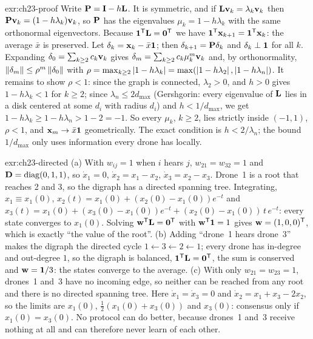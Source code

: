 \begin{solution}{exr:ch23-proof}
Write $\mathbf{P}=\mathbf{I}-h\mathbf{L}$. It is symmetric, and if $\mathbf{L}\mathbf{v}_k=\lambda_k\mathbf{v}_k$ then $\mathbf{P}\mathbf{v}_k=(1-h\lambda_k)\mathbf{v}_k$, so $\mathbf{P}$ has the eigenvalues $\mu_k=1-h\lambda_k$ with the same orthonormal eigenvectors. Because $\mathbf{1}^{\mathsf{T}}\mathbf{L}=\mathbf{0}^{\mathsf{T}}$ we have $\mathbf{1}^{\mathsf{T}}\mathbf{x}_{k+1}=\mathbf{1}^{\mathsf{T}}\mathbf{x}_k$: the average $\bar x$ is preserved. Let $\mathbf{\delta}_k=\mathbf{x}_k-\bar x\mathbf{1}$; then $\mathbf{\delta}_{k+1}=\mathbf{P}\mathbf{\delta}_k$ and $\mathbf{\delta}_k\perp\mathbf{1}$ for all $k$. Expanding $\mathbf{\delta}_0=\sum_{k\ge2}c_k\mathbf{v}_k$ gives $\mathbf{\delta}_m=\sum_{k\ge2}c_k\mu_k^m\mathbf{v}_k$ and, by orthonormality, $\left\lVert \mathbf{\delta}_m \right\rVert\le\rho^m\left\lVert \mathbf{\delta}_0 \right\rVert$ with $\rho=\max_{k\ge2}\left\lvert 1-h\lambda_k \right\rvert=\max(\left\lvert 1-h\lambda_2 \right\rvert,\left\lvert 1-h\lambda_n \right\rvert)$. It remains to show $\rho<1$: since the graph is connected, $\lambda_2>0$, and $h>0$ gives $1-h\lambda_k<1$ for $k\ge2$; since $\lambda_n\le 2d_{\max}$ (Gershgorin: every eigenvalue of $\mathbf{L}$ lies in a disk centered at some $d_i$ with radius $d_i$) and $h<1/d_{\max}$, we get $1-h\lambda_k\ge1-h\lambda_n>1-2=-1$. So every $\mu_k$, $k\ge2$, lies strictly inside $(-1,1)$, $\rho<1$, and $\mathbf{x}_m\to\bar x\mathbf{1}$ geometrically. The exact condition is $h<2/\lambda_n$; the bound $1/d_{\max}$ only uses information every drone has locally.
\end{solution}

\begin{solution}{exr:ch23-directed}
(a) With $w_{ij}=1$ when $i$ hears $j$, $w_{21}=w_{32}=1$ and $\mathbf{D}=\operatorname{diag}(0,1,1)$, so $\dot x_1=0$, $\dot x_2=x_1-x_2$, $\dot x_3=x_2-x_3$. Drone~1 is a root that reaches 2 and 3, so the digraph has a directed spanning tree. Integrating, $x_1\equiv x_1(0)$, $x_2(t)=x_1(0)+(x_2(0)-x_1(0))e^{-t}$ and $x_3(t)=x_1(0)+(x_3(0)-x_1(0))e^{-t}+(x_2(0)-x_1(0))\,t\,e^{-t}$: every state converges to $x_1(0)$. Solving $\mathbf{w}^{\mathsf{T}}\mathbf{L}=\mathbf{0}^{\mathsf{T}}$ with $\mathbf{w}^{\mathsf{T}}\mathbf{1}=1$ gives $\mathbf{w}=(1,0,0)^{\mathsf{T}}$, which is exactly ``the value of the root''. (b) Adding ``drone~1 hears drone~3'' makes the digraph the directed cycle $1\leftarrow3\leftarrow2\leftarrow1$; every drone has in-degree and out-degree $1$, so the digraph is balanced, $\mathbf{1}^{\mathsf{T}}\mathbf{L}=\mathbf{0}^{\mathsf{T}}$, the sum is conserved and $\mathbf{w}=\mathbf{1}/3$: the states converge to the average. (c) With only $w_{21}=w_{23}=1$, drones~1 and~3 have no incoming edge, so neither can be reached from any root and there is no directed spanning tree. Here $\dot x_1=\dot x_3=0$ and $\dot x_2=x_1+x_3-2x_2$, so the limits are $x_1(0)$, $\tfrac12(x_1(0)+x_3(0))$ and $x_3(0)$: consensus only if $x_1(0)=x_3(0)$. No protocol can do better, because drones~1 and~3 receive nothing at all and can therefore never learn of each other.
\end{solution}

